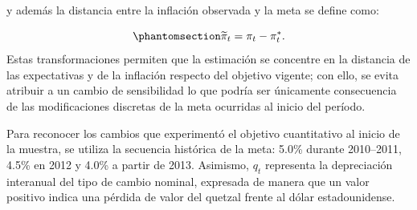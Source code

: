 \documentclass[
  10.5pt,
  letterpaper,
  twocolumn]{article}
\begin{document}
y además la distancia entre la inflación observada y la meta se define
como:

\begin{equation}\phantomsection\label{eq-gap-inflacion}{\widetilde \pi_t=\pi_t-\pi_t^*.}\end{equation}
Estas transformaciones permiten que la estimación se concentre en la
distancia de las expectativas y de la inflación respecto del objetivo
vigente; con ello, se evita atribuir a un cambio de sensibilidad lo que
podría ser únicamente consecuencia de las modificaciones discretas de la
meta ocurridas al inicio del período.

Para reconocer los cambios que experimentó el objetivo cuantitativo al
inicio de la muestra, se utiliza la secuencia histórica de la meta:
5.0\% durante 2010--2011, 4.5\% en 2012 y 4.0\% a partir de 2013.
Asimismo, \(q_t\) representa la depreciación interanual del tipo de
cambio nominal, expresada de manera que un valor positivo indica una
pérdida de valor del quetzal frente al dólar estadounidense.
\end{document}
